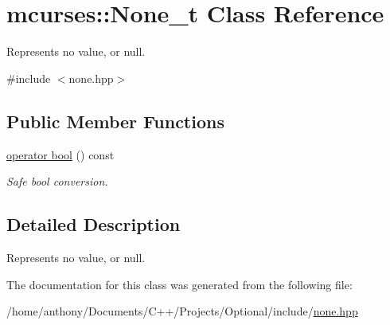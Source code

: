 \hypertarget{classmcurses_1_1None__t}{}\section{mcurses\+:\+:None\+\_\+t Class Reference}
\label{classmcurses_1_1None__t}


Represents \textquotesingle{}no value\textquotesingle{}, or null.  




{\ttfamily \#include $<$none.\+hpp$>$}

\subsection*{Public Member Functions}
\begin{DoxyCompactItemize}
\item 
\hypertarget{classmcurses_1_1None__t_a6e1fb4b6ee221d8d65c68a0c185a60b6}{}\label{classmcurses_1_1None__t_a6e1fb4b6ee221d8d65c68a0c185a60b6} 
\hyperlink{classmcurses_1_1None__t_a6e1fb4b6ee221d8d65c68a0c185a60b6}{operator bool} () const
\begin{DoxyCompactList}\small\item\em Safe bool conversion. \end{DoxyCompactList}\end{DoxyCompactItemize}


\subsection{Detailed Description}
Represents \textquotesingle{}no value\textquotesingle{}, or null. 

The documentation for this class was generated from the following file\+:\begin{DoxyCompactItemize}
\item 
/home/anthony/\+Documents/\+C++/\+Projects/\+Optional/include/\hyperlink{none_8hpp}{none.\+hpp}\end{DoxyCompactItemize}
